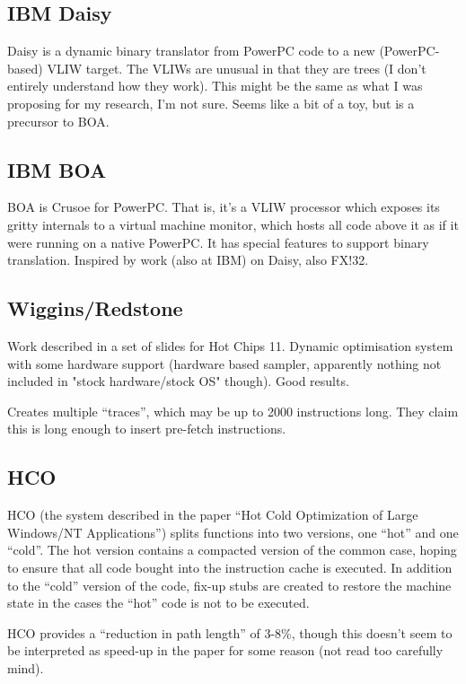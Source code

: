 \subsection{IBM Daisy}

Daisy is a dynamic binary translator from PowerPC code to a new (PowerPC-based) VLIW target. The VLIWs are unusual in that they are trees (I don't entirely understand how they work). This might be the same as what I was proposing for my research, I'm not sure. Seems like a bit of a toy, but is a precursor to BOA.

\subsection{IBM BOA}

BOA is Crusoe for PowerPC. That is, it's a VLIW processor which exposes its gritty internals to a virtual machine monitor, which hosts all code above it as if it were running on a native PowerPC. It has special features to support binary translation. Inspired by work (also at IBM) on Daisy, also FX!32.

\subsection{Wiggins/Redstone}

Work described in a set of slides for Hot Chips 11. Dynamic optimisation system with some hardware support (hardware based sampler, apparently nothing not included in "stock hardware/stock OS" though). Good results.

Creates multiple ``traces'', which may be up to 2000 instructions long. They claim this is long enough to insert pre-fetch instructions. 

\subsection{HCO}

HCO (the system described in the paper ``Hot Cold Optimization of Large Windows/NT Applications'') splits functions into two versions, one ``hot'' and one ``cold''. The hot version contains a compacted version of the common case, hoping to ensure that all code bought into the instruction cache is executed. In addition to the ``cold'' version of the code, fix-up stubs are created to restore the machine state in the cases the ``hot'' code is not to be executed.

HCO provides a ``reduction in path length'' of 3-8\%, though this doesn't seem to be interpreted as speed-up in the paper for some reason (not read too carefully mind). 

